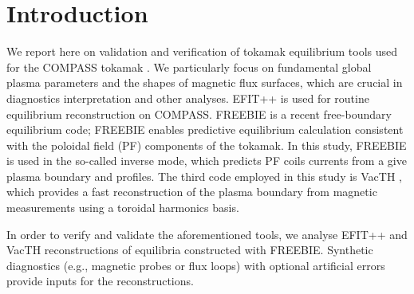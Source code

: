 
\section{Introduction} %
\label{sec:introduction}

We report here on validation and verification of tokamak equilibrium tools used for the COMPASS tokamak \cite{compass2006}. We particularly focus on fundamental global plasma parameters and the shapes of magnetic flux surfaces, which are crucial in diagnostics interpretation and other analyses. 
EFIT++ \cite{efitpp2006} is used for routine equilibrium reconstruction on COMPASS. FREEBIE \cite{freebie2012} is a recent free-boundary equilibrium code; FREEBIE enables predictive equilibrium calculation consistent with the poloidal field (PF) components of the tokamak. In this study, FREEBIE is used in the so-called inverse mode, which predicts PF coils currents from a give plasma boundary and profiles. The third code employed in this study is VacTH \cite{vacthref}, which provides a fast reconstruction of the plasma boundary from magnetic measurements using a toroidal harmonics basis.

In order to verify and validate the aforementioned tools, we analyse EFIT++ and VacTH reconstructions of equilibria constructed with FREEBIE. Synthetic diagnostics (e.g., magnetic probes or flux loops) with optional artificial errors provide inputs for the reconstructions. 


